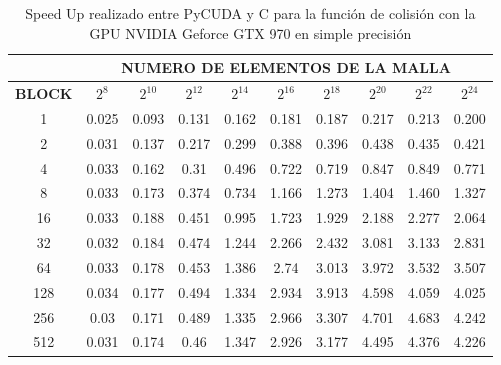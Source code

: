 \begin{table}[h!]
	\centering
	\begin{tabular}{|c|c|c|c|c|c|c|c|c|c|}
		\hline
		& \multicolumn{9}{c|}{\textbf{NUMERO DE ELEMENTOS DE LA MALLA}} \\ \hline
		\textbf{BLOCK} & $2^{8}$ & $2^{10}$& $2^{12}$& $2^{14}$& $2^{16}$& $2^{18}$& $2^{20}$& $2^{22}$& $2^{24}$\\ \hline
		1                               & 0.025   & 0.093    & 0.131    & 0.162    & 0.181    & 0.187    & 0.217    & 0.213    & 0.200 \\ \hline
		2                               & 0.031   & 0.137    & 0.217    & 0.299    & 0.388    & 0.396    & 0.438    & 0.435    & 0.421 \\ \hline
		4                               & 0.033   & 0.162    & 0.31     & 0.496    & 0.722    & 0.719    & 0.847    & 0.849    & 0.771 \\ \hline
		8                               & 0.033   & 0.173    & 0.374    & 0.734    & 1.166    & 1.273    & 1.404    & 1.460    & 1.327 \\ \hline
		16                              & 0.033   & 0.188    & 0.451    & 0.995    & 1.723    & 1.929    & 2.188    & 2.277    & 2.064 \\ \hline
		32                              & 0.032   & 0.184    & 0.474    & 1.244    & 2.266    & 2.432    & 3.081    & 3.133    & 2.831 \\ \hline
		64                              & 0.033   & 0.178    & 0.453    & 1.386    & 2.74     & 3.013    & 3.972    & 3.532    & 3.507 \\ \hline
		128                             & 0.034   & 0.177    & 0.494    & 1.334    & 2.934    & 3.913    & 4.598    & 4.059    & 4.025 \\ \hline
		256                             & 0.03    & 0.171    & 0.489    & 1.335    & 2.966    & 3.307    & 4.701    & 4.683    & 4.242 \\ \hline
		512                             & 0.031   & 0.174    & 0.46     & 1.347    & 2.926    & 3.177    & 4.495    & 4.376    & 4.226 \\ \hline
	\end{tabular}
	\caption{Speed Up realizado entre PyCUDA y C para la función de colisión con la GPU NVIDIA Geforce GTX 970 en simple precisión}
	\label{tab:s_py_c_970_test_simple_10}
\end{table}
